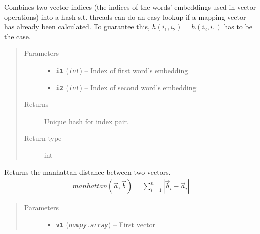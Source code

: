 \documentclass[letterpaper,10pt,english]{sphinxmanual}
\begin{document}
\begin{fulllineitems}

\begin{fulllineitems}
\label{src.mapping:src.mapping.mapthreading.MappingWorkerThread.hash_indices}
Combines two vector indices (the indices of the words' embeddings used in vector operations) into a hash
s.t. threads can do an easy lookup if a mapping vector has already been calculated.
To guarantee this, \(h(i_1, i_2) = h(i_2, i_1)\) has to be the case.
\begin{quote}\begin{description}
\item[{Parameters}] \leavevmode\begin{itemize}
\item {} 
\textbf{\texttt{i1}} (\emph{\texttt{int}}) -- Index of first word's embedding

\item {} 
\textbf{\texttt{i2}} (\emph{\texttt{int}}) -- Index of second word's embedding

\end{itemize}

\item[{Returns}] \leavevmode
Unique hash for index pair.

\item[{Return type}] \leavevmode
int

\end{description}\end{quote}

\end{fulllineitems}


\begin{fulllineitems}
\label{src.mapping:src.mapping.mapthreading.MappingWorkerThread.manhattan_distance}
Returns the manhattan distance between two vectors.
\begin{equation*}
\begin{split}manhattan(\vec{a}, \vec{b}) = \sum_{i=1}^n |\vec{b}_i - \vec{a}_i |\end{split}
\end{equation*}\begin{quote}\begin{description}
\item[{Parameters}] \leavevmode\begin{itemize}
\item {} 
\textbf{\texttt{v1}} (\emph{\texttt{numpy.array}}) -- First vector


\end{itemize}
\end{description}
\end{quote}
\end{fulllineitems}
\end{fulllineitems}
\end{document}
